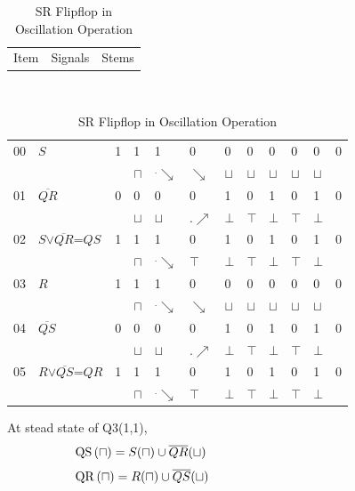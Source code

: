 \documentclass[10pt,journal]{IEEEtran}
\begin{document}
\begin{table}[H] \caption{SR Flipflop in Oscillation Operation}\centering\begin{tabular}{|p{.3cm}|p{1.5cm}|p{5.5cm}|}\hline Item&Signals &Stems \\ \end{tabular} \\ \begin{tabular}{|p{.3cm}|p{1.5cm}|p{.1cm}|p{.1cm}|p{.3cm}|p{.47cm}|p{.1cm}                                  |p{.1cm}|p{.1cm}|p{.1cm}|p{.1cm}|p{.1cm}|}\hline 00&$S$ &1&1&1&0&0&0&0&0&0&0 \\    & & &$\sqcap$&$^.\searrow$&$\searrow$&$\sqcup$&$\sqcup$&$\sqcup$&$\sqcup$&$\sqcup$& \\ \hline 01&$\overline{QR}$ &0&0&0&0&1&0&1&0&1&0 \\    & & &$\sqcup$&$\sqcup$&$.\nearrow$&$\bot$&$\top$&$\bot$&$\top$&$\bot$& \\ \hline 02&$S$$\vee$$\overline{QR}$=$QS$&1&1&1&0&1&0&1&0&1&0 \\    & & &$\sqcap$&$^.\searrow$&$\top$&$\bot$&$\top$&$\bot$&$\top$&$\bot$& \\ \hline 03&$R$ &1&1&1&0&0&0&0&0&0&0 \\    & & &$\sqcap$&$^.\searrow$&$\searrow$&$\sqcup$&$\sqcup$&$\sqcup$&$\sqcup$&$\sqcup$& \\ \hline 04&$\overline{QS}$ &0&0&0&0&1&0&1&0&1&0 \\    & & &$\sqcup$&$\sqcup$&$.\nearrow$&$\bot$&$\top$&$\bot$&$\top$&$\bot$& \\ \hline 05&$R$$\vee$$\overline{QS}$=$QR$&1&1&1&0&1&0&1&0&1&0 \\    & & &$\sqcap$&$^.\searrow$&$\top$&$\bot$&$\top$&$\bot$&$\top$&$\bot$& \\ \hline \end{tabular} \end{table} 
At stead state of Q3(1,1), 
\begin{equation}
 \begin{minipage}{250pt}
\begin{flushleft} $\displaystyle \operatorname{QS}{\left(\sqcap \right)} = S{\left(\sqcap \right)} \cup \overline{QR}{\left(\sqcup \right)}$  \end{flushleft}
 \end{minipage}
 \end{equation}
\begin{equation}
 \begin{minipage}{250pt}
\begin{flushleft} $\displaystyle \operatorname{QR}{\left(\sqcap \right)} = R{\left(\sqcap \right)} \cup \overline{QS}{\left(\sqcup \right)}$  \end{flushleft}
 \end{minipage}
 \end{equation}
\end{document}
